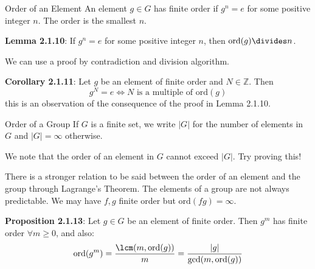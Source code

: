 \documentclass{report}
\begin{document}
\begin{definition}[\label{def:2.1.9}]{Order of an Element}
    An element $g \in G$ has finite order if $g^{n} = e$ for some positive integer $n$. The order is the smallest $n$.
\end{definition}

\textbf{Lemma 2.1.10}: If $g^{n} = e$ for some positive integer $n$, then $\text{ord}(g) \divides n$.

We can use a proof by contradiction and division algorithm.

\textbf{Corollary 2.1.11}: Let $g$ be an element of finite order and $N \in \mathbb{Z}$. Then
    \begin{equation*}
        g^{N} = e \iff N \text{ is a multiple of } \text{ord}(g)
    \end{equation*}
this is an observation of the consequence of the proof in Lemma 2.1.10.

\begin{definition}[\label{def:2.1.12}]{Order of a Group}
    If $G$ is a finite set, we write $\lvert G \rvert$ for the number of elements in $G$ and $\lvert G \rvert = \infty$ otherwise.
\end{definition}

We note that the order of an element in $G$ cannot exceed $\lvert G \rvert$. Try proving this!

There is a stronger relation to be said between the order of an element and the group through Lagrange's Theorem. The elements of a group are not always predictable. We may have $f, g$ finite order but $\text{ord}(fg) = \infty$.

\textbf{Proposition 2.1.13}: Let $g \in G$ be an element of finite order. Then $g^{m}$ has finite order $\forall m \geq 0$, and also:
    \begin{equation*}
        \text{ord}(g^{m}) = \dfrac{\lcm(m, \text{ord}(g))}{m} = \dfrac{\lvert g \rvert}{\gcd(m, \text{ord}(g))}
    \end{equation*}
\end{document}
